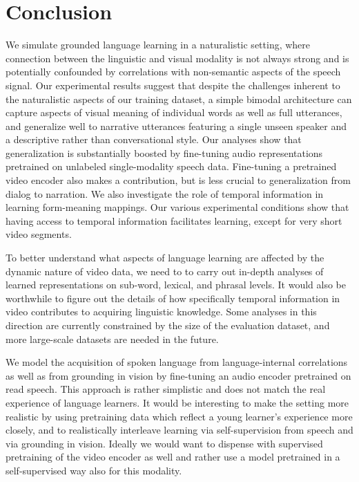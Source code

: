 \section{Conclusion}
\label{sec:conclusion}
We simulate grounded language learning in a naturalistic setting, where 
connection between the linguistic and visual modality is not always strong 
and is potentially confounded by correlations with non-semantic aspects of 
the speech signal. Our experimental results suggest that despite the 
challenges inherent to the naturalistic aspects of our training dataset, a 
simple bimodal architecture can capture aspects of visual meaning of individual 
words as well as full utterances, and generalize well to narrative utterances
featuring a single unseen speaker and a descriptive rather than
conversational style. Our analyses show that generalization is substantially
boosted by fine-tuning audio representations pretrained on unlabeled
single-modality speech data. Fine-tuning a pretrained video encoder
also makes a contribution, but is less crucial to generalization from
dialog to narration.
%
We also investigate the role of temporal information in learning form-meaning 
mappings. Our various experimental conditions show that having access to 
temporal information facilitates learning, except for very short video segments. 

To better understand what aspects of language learning are affected by 
the dynamic nature of video data, we need to to carry out in-depth analyses of learned 
representations on sub-word, lexical, and phrasal levels. It would also be 
worthwhile to figure out the details of how specifically temporal information 
in video contributes to acquiring linguistic knowledge.  Some analyses in 
this direction are currently constrained by the size of the evaluation 
dataset, and more large-scale datasets are needed in the future.

We model the acquisition of spoken language from 
language-internal correlations as well as from grounding in vision 
by fine-tuning an audio encoder pretrained on read speech. This 
approach is rather simplistic and does not match the real experience of 
language learners. It would be interesting to make the setting
more realistic by using pretraining data which reflect a young
learner's experience more closely, and to realistically interleave learning via
self-supervision from speech and via grounding in vision.
Ideally we would want to dispense with supervised pretraining of 
the video encoder as well and rather use a model pretrained in a
self-supervised way also for this modality.


